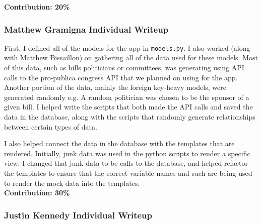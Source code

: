 \documentclass{article}
\newcommand{\n}{\noindent}
\begin{document}
\n\textbf{Contribution: 20\%}
\pagebreak

\subsubsection*{Matthew Gramigna Individual Writeup}

First, I defined all of the models for the app in \verb|models.py|. I also worked (along with Matthew Bissaillon) on gathering all of the data used for these models. Most of this data, such as bills politicians or committees, was generating using API calls to the pro-publica congress API that we planned on using for the app.  Another portion of the data, mainly the foreign key-heavy models, were generated randomly e.g. A random politician was chosen to be the sponsor of a given bill. I helped write the scripts that both made the API calls and saved the data in the database, along with the scripts that randomly generate relationships between certain types of data.

I also helped connect the data in the database with the templates that are rendered. Initially, junk data was used in the python scripts to render a specific view. I changed that junk data to be calls to the database, and helped refactor the templates to ensure that the correct variable names and such are being used to render the mock data into the templates. \\

\n\textbf{Contribution: 30\%} 

\pagebreak

\subsubsection*{Justin Kennedy Individual Writeup}
\end{document}

